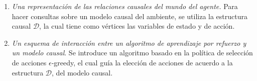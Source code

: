 \begin{enumerate}
    \item \textit{Una representación de las relaciones causales del mundo del agente.} Para hacer consultas sobre un modelo causal del ambiente, se utiliza la estructura causal $\mathcal{D}$, la cual tiene como vértices las variables de estado y de acción.
    \item  \textit{Un esquema de interacción entre un algoritmo de aprendizaje por refuerzo
    y un modelo causal}. Se introduce un algoritmo basado en la política de selección
    de acciones $\epsilon$-greedy, el cual guía la elección de acciones de acuerdo a la estructura $\mathcal{D}$, del modelo causal.
\end{enumerate}
